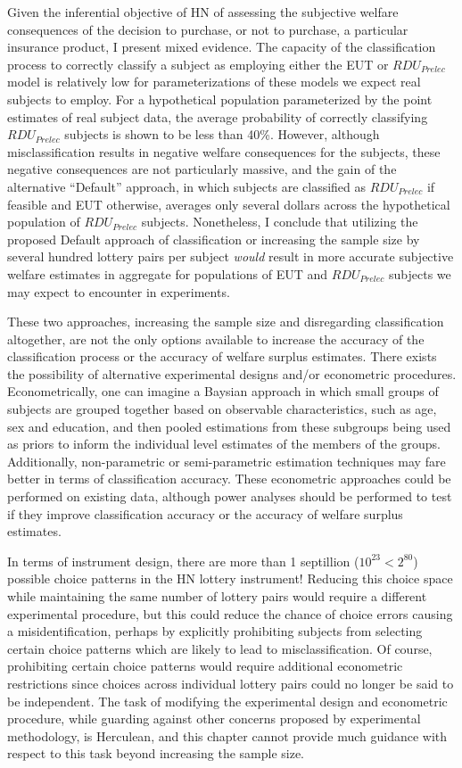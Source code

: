 \documentclass[../main.tex]{subfiles}
\begin{document}
Given the inferential objective of HN of assessing the subjective welfare consequences of the decision to purchase, or not to purchase, a particular insurance product, I present mixed evidence.
The capacity of the classification process to correctly classify a subject as employing either the EUT or $\mathit{RDU_{Prelec}}$ model is relatively low for parameterizations of these models we expect real subjects to employ.
For a hypothetical population parameterized by the point estimates of real subject data, the average probability of correctly classifying $\mathit{RDU_{Prelec}}$ subjects is shown to be less than 40\%.
However, although misclassification results in negative welfare consequences for the subjects, these negative consequences are not particularly massive, and the gain of the alternative \enquote{Default} approach, in which subjects are classified as $\mathit{RDU_{Prelec}}$ if feasible and EUT otherwise, averages only several dollars across the hypothetical population of $\mathit{RDU_{Prelec}}$ subjects.
Nonetheless, I conclude that utilizing the proposed Default approach of classification or increasing the sample size by several hundred lottery pairs per subject \textit{would} result in more accurate subjective welfare estimates in aggregate for populations of EUT and $\mathit{RDU_{Prelec}}$ subjects we may expect to encounter in experiments.

These two approaches, increasing the sample size and disregarding classification altogether, are not the only options available to increase the accuracy of the classification process or the accuracy of welfare surplus estimates.
There exists the possibility of alternative experimental designs and/or econometric procedures.
Econometrically, one can imagine a Baysian approach in which small groups of subjects are grouped together based on observable characteristics, such as age, sex and education, and then pooled estimations from these subgroups being used as priors to inform the individual level estimates of the members of the groups.
Additionally, non-parametric or semi-parametric estimation techniques may fare better in terms of classification accuracy.
These econometric approaches could be performed on existing data, although power analyses should be performed to test if they improve classification accuracy or the accuracy of welfare surplus estimates.

In terms of instrument design, there are more than 1 septillion ($10^{23} < 2^{80}$) possible choice patterns in the HN lottery instrument!
Reducing this choice space while maintaining the same number of lottery pairs would require a different experimental procedure, but this could reduce the chance of choice errors causing a misidentification, perhaps by explicitly prohibiting subjects from selecting certain choice patterns which are likely to lead to misclassification.
Of course, prohibiting certain choice patterns would require additional econometric restrictions since choices across individual lottery pairs could no longer be said to be independent.
The task of modifying the experimental design and econometric procedure, while guarding against other concerns proposed by experimental methodology, is Herculean, and this chapter cannot provide much guidance with respect to this task beyond increasing the sample size.
\end{document}

